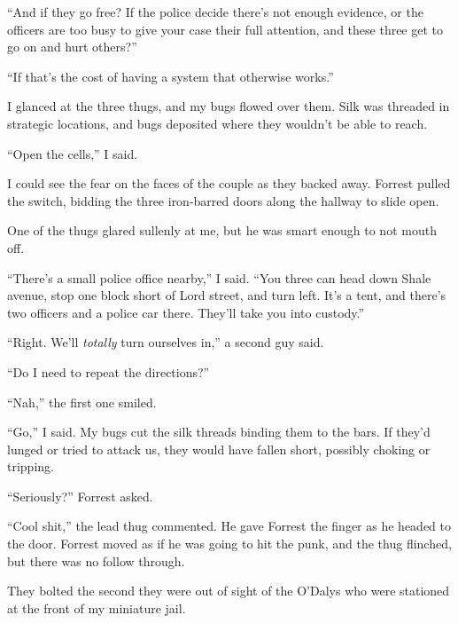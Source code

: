 ``And if they go free?  If the police decide there's not enough evidence, or the officers are too busy to give your case their full attention, and these three get to go on and hurt others?''



``If that's the cost of having a system that otherwise works.''



I glanced at the three thugs, and my bugs flowed over them.  Silk was threaded in strategic locations, and bugs deposited where they wouldn't be able to reach.



``Open the cells,'' I said.



I could see the fear on the faces of the couple as they backed away.  Forrest pulled the switch, bidding the three iron-barred doors along the hallway to slide open.



One of the thugs glared sullenly at me, but he was smart enough to not mouth off.



``There's a small police office nearby,'' I said.  ``You three can head down Shale avenue, stop one block short of Lord street, and turn left.  It's a tent, and there's two officers and a police car there.  They'll take you into custody.''



``Right.  We'll \emph{totally} turn ourselves in,'' a second guy said.



``Do I need to repeat the directions?''



``Nah,'' the first one smiled.



``Go,'' I said.  My bugs cut the silk threads binding them to the bars.  If they'd lunged or tried to attack us, they would have fallen short, possibly choking or tripping.



``Seriously?'' Forrest asked.



``Cool shit,'' the lead thug commented.  He gave Forrest the finger as he headed to the door.  Forrest moved as if he was going to hit the punk, and the thug flinched, but there was no follow through.



They bolted the second they were out of sight of the O'Dalys who were stationed at the front of my miniature jail.



